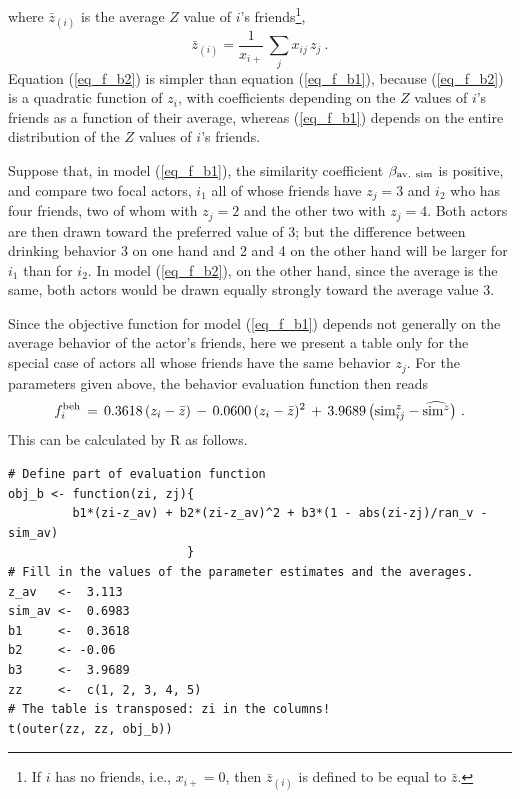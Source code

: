 \documentclass[a4paper,fleqn,11pt]{article}
\newcommand{\+}{\, + \,}
\newcommand{\R}{{\sf R }}
\begin{document}
\noindent
where $\bar z_{(i)} $ is the average $Z$ value of $i$'s
friends\footnote{If $i$ has no friends, i.e., $x_{i+} = 0$,
then $\bar z_{(i)} $ is defined
to be equal to $\bar z$.},
\[
  \bar z_{(i)}  =\frac{1}{x_{i+}} \, \sum_j x_{ij}\, z_j   \ .
\]
Equation (\ref{eq_f_b2}) is simpler than equation (\ref{eq_f_b1}), because
(\ref{eq_f_b2}) is a quadratic function of $z_i$, with coefficients depending
on the $Z$ values of $i$'s friends as a function of their average,
whereas (\ref{eq_f_b1}) depends on the entire distribution
of the $Z$ values of $i$'s friends.

Suppose that, in model (\ref{eq_f_b1}),
the similarity coefficient $\beta_{\rm av.\ sim}$ is positive,
and compare two focal actors,
$i_1$  all of whose friends have $z_j = 3$
and $i_2$ who has four friends, two of whom with
$z_j = 2$ and the other two with $z_j = 4$.
Both actors are then drawn toward the preferred value
of 3; but the difference between drinking behavior 3 on one hand
and 2 and 4 on the other hand will be larger for $i_1$
than for $i_2$.
In model (\ref{eq_f_b2}), on the other hand,
since the average is the same,
both actors would be drawn equally strongly toward
the average value 3.

Since the objective function for model (\ref{eq_f_b1}) depends
not generally on the average behavior of the actor's friends,
here we present a table only for the special case of actors
all whose friends have the same behavior $z_{j}$.
For the parameters given above, the behavior
evaluation function then reads
\[
   f^{\rm beh}_i \,=\, 0.3618 \, (z_i - \bar z)
              \,-\, 0.0600 \, (z_i - \bar z)^2 \,+\,
             3.9689 \,  \big({\rm sim}^z_{ij} - \widehat{{\rm sim}^z}\big) \ .
\]
This can be calculated by \R  as follows.
\begin{footnotesize}
\begin{verbatim}
# Define part of evaluation function
obj_b <- function(zi, zj){
         b1*(zi-z_av) + b2*(zi-z_av)^2 + b3*(1 - abs(zi-zj)/ran_v - sim_av)
                         }
# Fill in the values of the parameter estimates and the averages.
z_av   <-  3.113
sim_av <-  0.6983
b1     <-  0.3618
b2     <- -0.06
b3     <-  3.9689
zz     <-  c(1, 2, 3, 4, 5)
# The table is transposed: zi in the columns!
t(outer(zz, zz, obj_b))
\end{verbatim}
\end{footnotesize}
\end{document}
